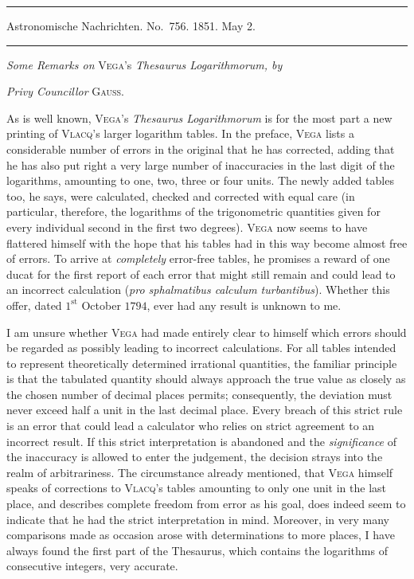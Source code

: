 \par{}
\begin{center}
\rule{0.7\linewidth}{0.4pt}\par
Astronomische Nachrichten. No.\ 756. 1851. May 2.\par
\rule{0.7\linewidth}{0.4pt}
\end{center}
\begin{center}\emph{Some Remarks on} \textsc{Vega}'s \emph{Thesaurus Logarithmorum, by}\par
\emph{Privy Councillor} \textsc{Gauss}.\end{center}

As is well known, \textsc{Vega}'s \emph{Thesaurus Logarithmorum} is for the most part a new printing of \textsc{Vlacq}'s larger logarithm tables. In the preface, \textsc{Vega} lists a considerable number of errors in the original that he has corrected, adding that he has also put right a very large number of inaccuracies in the last digit of the logarithms, amounting to one, two, three or four units. The newly added tables too, he says, were calculated, checked and corrected with equal care (in particular, therefore, the logarithms of the trigonometric quantities given for every individual second in  the first two degrees). \textsc{Vega} now seems to have flattered himself with the hope that his tables had in this way become almost free of errors. To arrive at \emph{completely} error-free tables, he promises a reward of one ducat for the first report of each error that might still remain and could lead to an incorrect calculation (\emph{pro sphalmatibus calculum turbantibus}). Whether this offer, dated $1^{\mathrm{st}}$ October $1794$, ever had any result is unknown to me.

I am unsure whether \textsc{Vega} had made entirely clear to himself which errors should be regarded as possibly leading to incorrect calculations. For all tables intended to represent theoretically determined irrational quantities, the familiar principle is that the tabulated quantity should always approach the true value as closely as the chosen number of decimal places permits; consequently, the deviation must never exceed half a unit in the last decimal place. Every breach of this strict rule is an error that could lead a calculator who relies on strict agreement to an incorrect result. If this strict interpretation is abandoned and the \emph{significance} of the inaccuracy is allowed to enter the judgement, the decision strays into the realm of arbitrariness. The circumstance already mentioned, that \textsc{Vega} himself speaks of corrections to \textsc{Vlacq}'s tables amounting to only one unit in the last place, and describes complete freedom from error as his goal, does indeed seem to indicate that he had the strict interpretation in mind. Moreover, in very many comparisons made as occasion arose with determinations to more places, I have always found the first part of the Thesaurus, which contains the logarithms of consecutive integers, very accurate.

